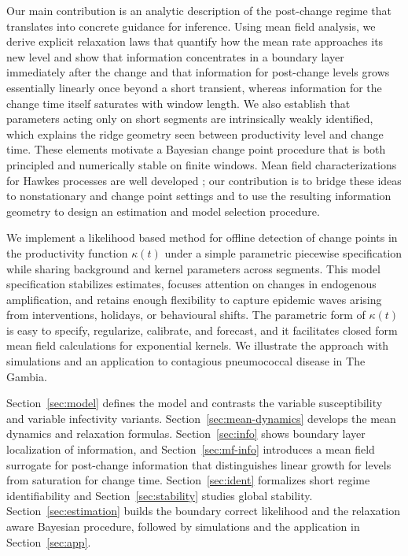\documentclass{article}
\theoremstyle{plain}
\theoremstyle{definition}
\newcommand{\1}{\mathbf{1}}
\begin{document}
    
    Our main contribution is an analytic description of the post-change regime that translates into concrete guidance for inference. Using mean field analysis, we derive explicit relaxation laws that quantify how the mean rate approaches its new level and show that information concentrates in a boundary layer immediately after the change and that information for post-change levels grows essentially linearly once beyond a short transient, whereas information for the change time itself saturates with window length. We also establish that parameters acting only on short segments are intrinsically weakly identified, which explains the ridge geometry seen between productivity level and change time. These elements motivate a Bayesian change point procedure that is both principled and numerically stable on finite windows. Mean field characterizations for Hawkes processes are well developed \cite{chevallier2017mean,clinet2017statistical,dassios2011dynamic,duarte2019stability}; our contribution is to bridge these ideas to nonstationary and change point settings and to use the resulting information geometry to design an estimation and model selection procedure.
    
    We implement a likelihood based method for offline detection of change points in the productivity function $\kappa(t)$ under a simple parametric piecewise specification while sharing background and kernel parameters across segments. This model specification stabilizes estimates, focuses attention on changes in endogenous amplification, and retains enough flexibility to capture epidemic waves arising from interventions, holidays, or behavioural shifts. The parametric form of $\kappa(t)$ is easy to specify, regularize, calibrate, and forecast, and it facilitates closed form mean field calculations for exponential kernels. We illustrate the approach with simulations and an application to contagious pneumococcal disease in The Gambia.
    
    Section~\ref{sec:model} defines the model and contrasts the variable susceptibility and variable infectivity variants. Section~\ref{sec:mean-dynamics} develops the mean dynamics and relaxation formulas. Section~\ref{sec:info} shows boundary layer localization of information, and Section~\ref{sec:mf-info} introduces a mean field surrogate for post-change information that distinguishes linear growth for levels from saturation for change time. Section~\ref{sec:ident} formalizes short regime identifiability and Section~\ref{sec:stability} studies global stability. Section~\ref{sec:estimation} builds the boundary correct likelihood and the relaxation aware Bayesian procedure, followed by simulations and the application in Section~\ref{sec:app}.
    
\end{document}
